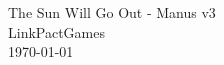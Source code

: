 \documentclass{book}
\begin{document}
\begin{titlepage}
\vfill
\centering
{\Huge The Sun Will Go Out - Manus v3}\\[1cm]
{\Large LinkPactGames}\\[0.6cm]
\today
\vfill
\end{titlepage}
\end{document}
